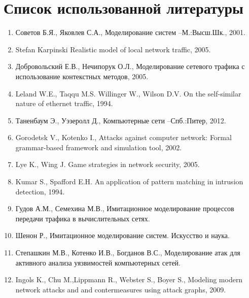 \newpage

\chapter*{Список использованной литературы}

\renewcommand{\labelenumi}{\arabic{enumi}.}

\begin{enumerate}
    \item Советов Б.Я., Яковлев С.А., Моделирование систем –М.:Высш.Шк., 2001.

    \item Stefan Karpinski Realistic model of local network traffic, 2005.

    \item Добровольский Е.В., Нечипорук О.Л., Моделирование сетевого трафика с использование контекстных методов, 2005.

    \item  Leland W.E., Taqqu M.S. Willinger W., Wilson D.V. On the self-similar nature of ethernet traffic, 1994.

    \item Таненбаум Э., Уэзеролл Д., Компьютерные сети –Спб.:Питер, 2012.

    \item  Gorodetsk V., Kotenko I., Attacks against computer network: Formal grammar-based framework and simulation tool, 2002.

    \item  Lye K., Wing J. Game strategies in network security, 2005.

    \item  Kumar S., Spafford E.H. An application of pattern matching in intrusion detection, 1994.

    \item Гудов А.М., Семехина М.В., Имитационное моделирование процессов передачи трафика в вычислительных сетях.

    \item Шенон Р., Имитационное моделирование систем. Искусство и наука.

    \item Степашкин М.В., Котенко И.В., Богданов В.С., Моделирование атак для активного анализа уязвимостей компьютерных сетей.

    \item  Ingols K., Chu M.,Lippmann R., Webster S., Boyer S.,  Modeling modern network attacks and and contermeasures using attack graphs, 2009.


\end{enumerate}
